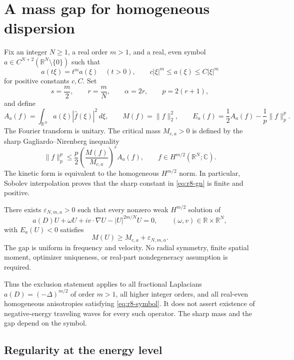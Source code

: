 \section{A mass gap for homogeneous dispersion}\label{sec:r8-homogeneous}

Fix an integer $N\ge1$, a real order $m>1$, and a real, even symbol
$a\in C^{N+2}(\mathbb R^N\setminus\{0\})$ such that
\begin{equation}\label{eq:r8-symbol}
 a(t\xi)=t^m a(\xi)\quad(t>0),\qquad
 c|\xi|^m\le a(\xi)\le C|\xi|^m
\end{equation}
for positive constants $c,C$. Set
\[
 s=\frac m2,\qquad r=\frac mN,\qquad
 \alpha=2r,\qquad p=2(r+1),
\]
and define
\[
 A_a(f)=\int_{\mathbb R^N}a(\xi)|\widehat f(\xi)|^2\,d\xi,\qquad
 M(f)=\|f\|_2^2,\qquad
 E_a(f)=\frac12 A_a(f)-\frac1p\|f\|_p^p.
\]
The Fourier transform is unitary. The critical mass $M_{c,a}>0$ is defined
by the sharp Gagliardo--Nirenberg inequality
\begin{equation}\label{eq:r8-gn}
 \|f\|_p^p\le\frac p2
 \left(\frac{M(f)}{M_{c,a}}\right)^r A_a(f),
 \qquad f\in H^{m/2}(\mathbb R^N;\mathbb C).
\end{equation}
The kinetic form is equivalent to the homogeneous $H^{m/2}$ norm.
In particular, Sobolev interpolation proves that the sharp constant in
\eqref{eq:r8-gn} is finite and positive.

\begin{theorem}\label{thm:r8-homogeneous-gap}
There exists $\varepsilon_{N,m,a}>0$ such that every nonzero weak
$H^{m/2}$ solution of
\begin{equation}\label{eq:r8-profile}
 a(D)U+\omega U+i v\cdot\nabla U-|U|^{2m/N}U=0,
 \qquad (\omega,v)\in\mathbb R\times\mathbb R^N,
\end{equation}
with $E_a(U)<0$ satisfies
\[
 M(U)\ge M_{c,a}+\varepsilon_{N,m,a}.
\]
The gap is uniform in frequency and velocity. No radial symmetry,
finite spatial moment, optimizer uniqueness, or real-part
nondegeneracy assumption is required.
\end{theorem}

Thus the exclusion statement applies to all fractional Laplacians
$a(D)=(-\Delta)^{m/2}$ of order $m>1$, all higher integer orders, and
all real-even homogeneous anisotropies satisfying \eqref{eq:r8-symbol}.
It does not assert existence of negative-energy traveling waves for
every such operator. The sharp mass and the gap depend on the symbol.

\subsection{Regularity at the energy level}


